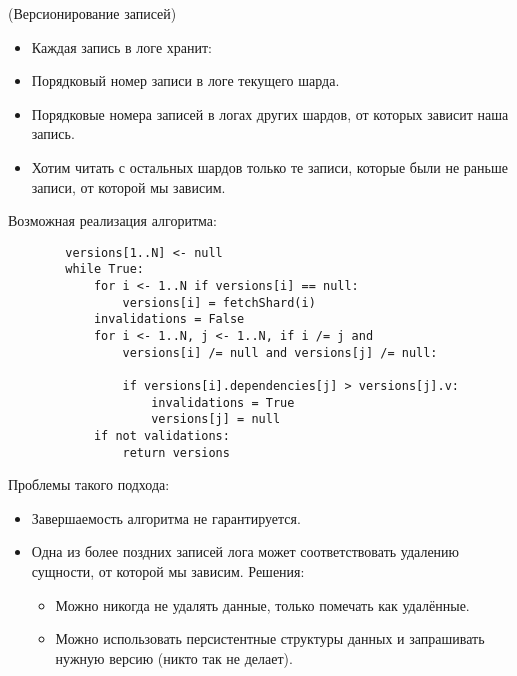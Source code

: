 \begin{algorithm}(Версионирование записей)
    \begin{itemize}
        \item Каждая запись в логе хранит:
        \item Порядковый номер записи в логе текущего шарда.
        \item Порядковые номера записей в логах других шардов, от которых зависит наша запись.
        \item Хотим читать с остальных шардов только те записи, которые были не раньше записи, от которой мы зависим.
    \end{itemize}

    Возможная реализация алгоритма:
    \begin{lstlisting}
        versions[1..N] <- null
        while True:
            for i <- 1..N if versions[i] == null:
                versions[i] = fetchShard(i)
            invalidations = False
            for i <- 1..N, j <- 1..N, if i /= j and
                versions[i] /= null and versions[j] /= null:

                if versions[i].dependencies[j] > versions[j].v:
                    invalidations = True
                    versions[j] = null
            if not validations:
                return versions
    \end{lstlisting}

    Проблемы такого подхода:
    \begin{itemize}
        \item Завершаемость алгоритма не гарантируется.
        \item Одна из более поздних записей лога может соответствовать удалению сущности, от которой мы зависим. Решения:
        \begin{itemize}
            \item Можно никогда не удалять данные, только помечать как удалённые.
            \item Можно использовать персистентные структуры данных и запрашивать нужную версию (никто так не делает).
        \end{itemize}
    \end{itemize}
\end{algorithm}
